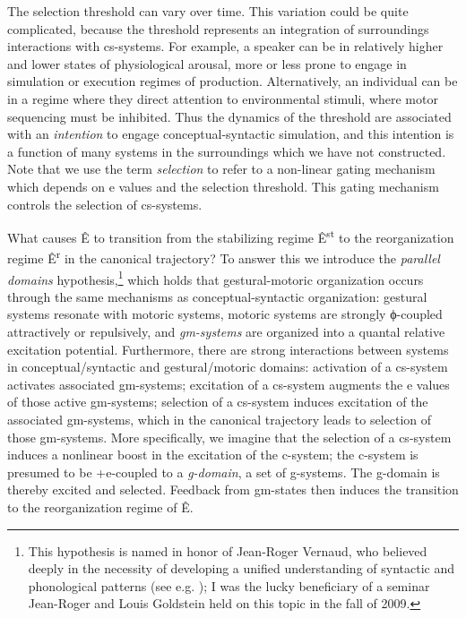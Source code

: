   The selection threshold can vary over time. This variation could be quite complicated, because the threshold represents an integration of surroundings interactions with cs-systems. For example, a speaker can be in relatively higher and lower states of physiological arousal, more or less prone to engage in simulation or execution regimes of production. Alternatively, an individual can be in a regime where they direct attention to environmental stimuli, where motor sequencing must be inhibited. Thus the dynamics of the threshold are associated with an \textit{intention} to engage conceptual-syntactic simulation, and this intention is a function of many systems in the surroundings which we have not constructed. Note that we use the term \textit{selection} to refer to a non-linear gating mechanism which depends on e values and the selection threshold. This gating mechanism controls the selection of cs-systems.

  What causes Ê to transition from the stabilizing regime Ê\textsuperscript{st} to the reorganization regime Ê\textsuperscript{r} in the canonical trajectory? To answer this we introduce the \textit{parallel domains} hypothesis,\footnote{This hypothesis is named in honor of Jean-Roger Vernaud, who believed deeply in the necessity of developing a unified understanding of syntactic and phonological patterns (see e.g. \citealt{FreidinVergnaud2001,Vergnaud1977}); I was the lucky beneficiary of a seminar Jean-Roger and Louis Goldstein held on this topic in the fall of 2009.} which holds that gestural-motoric organization occurs through the same mechanisms as conceptual-syntactic organization: gestural systems resonate with motoric systems, motoric systems are strongly ϕ-coupled attractively or repulsively, and \textit{gm-systems} are organized into a quantal relative excitation potential. Furthermore, there are strong interactions between systems in conceptual/syntactic and gestural/motoric domains: activation of a cs-system activates associated gm-systems; excitation of a cs-system augments the e values of those active gm-systems; selection of a cs-system induces excitation of the associated gm-systems, which in the canonical trajectory leads to selection of those gm-systems. More specifically, we imagine that the selection of a cs-system induces a nonlinear boost in the excitation of the c-system; the c-system is presumed to be +e-coupled to a \textit{g-domain}, a set of g-systems. The g-domain is thereby excited and selected. Feedback from gm-states then induces the transition to the reorganization regime of  Ê.

